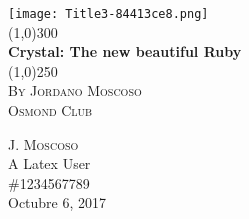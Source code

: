 \begin{titlepage}
	\begin{center}
	\texttt{[image: Title3-84413ce8.png]}\\
	\line(1,0){300}\\
	[0.5cm]
	\huge{\bfseries Crystal: The new beautiful Ruby}\\
	[0.1cm]
	\line(1,0){250}\\
	\textsc{\LARGE By Jordano Moscoso}\\
	\textsc{\Large Osmond Club}\\
	[8cm]
	\end{center}
	\begin{flushright}
	\textsc{\large J. Moscoso}\\
	A Latex User \\
	\#1234567789 \\
	Octubre 6, 2017 \\
	\end{flushright}
\end{titlepage}
